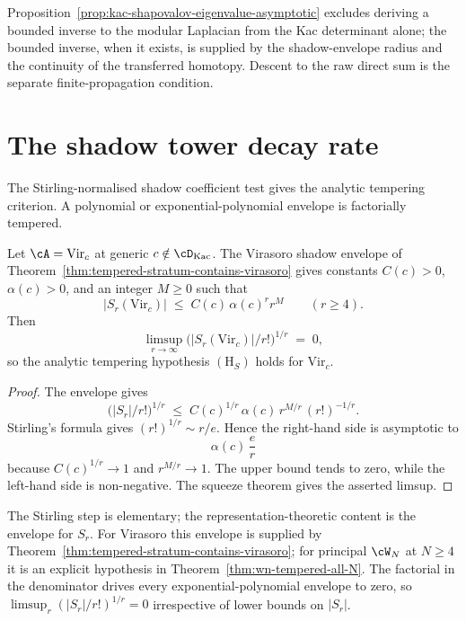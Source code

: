 \begin{remark}
\label{rem:why-no-naive-geometric-series}
Proposition~\ref{prop:kac-shapovalov-eigenvalue-asymptotic} excludes
deriving a bounded inverse to the modular Laplacian from the Kac
determinant alone; the bounded inverse, when it exists, is supplied by
the shadow-envelope radius and the continuity of the transferred
homotopy. Descent to the raw direct sum is the separate
finite-propagation condition.
\end{remark}

\section{The shadow tower decay rate}
\label{sec:shadow-tower-decay}

The Stirling-normalised shadow coefficient test gives the analytic
tempering criterion. A polynomial or exponential-polynomial envelope
is factorially tempered.

\begin{proposition}
\label{prop:shadow-decay-class-m}
Let $\cA = \mathrm{Vir}_c$ at generic $c \notin \cD_{\mathrm{Kac}}$.
The Virasoro shadow envelope of
Theorem~\ref{thm:tempered-stratum-contains-virasoro} gives constants
$C(c)>0$, $\alpha(c)>0$, and an integer $M\ge 0$ such that
\[
 \bigl\lvert S_r(\mathrm{Vir}_c) \bigr\rvert
 \;\le\;
 C(c)\,\alpha(c)^r r^M
 \qquad (r \ge 4).
\]
Then
\[
 \limsup_{r \to \infty}
 \bigl(\lvert S_r(\mathrm{Vir}_c) \rvert / r!\bigr)^{1/r}
 \;=\;
 0,
\]
so the analytic tempering hypothesis $(\mathrm{H}_S)$ holds for
$\mathrm{Vir}_c$.
\end{proposition}

\begin{proof}
The envelope gives
\[
 \bigl(\lvert S_r\rvert/r!\bigr)^{1/r}
 \;\le\;
 C(c)^{1/r}\,\alpha(c)\,r^{M/r}\,(r!)^{-1/r}.
\]
Stirling's formula gives $(r!)^{1/r}\sim r/e$. Hence the right-hand
side is asymptotic to
\[
 \alpha(c)\,\frac{e}{r}
\]
because $C(c)^{1/r}\to 1$ and $r^{M/r}\to 1$. The upper bound tends
to zero, while the left-hand side is non-negative. The squeeze theorem
gives the asserted limsup.
\end{proof}

\begin{remark}
\label{rem:comparison-classical-va-asymptotics}
The Stirling step is elementary; the representation-theoretic content
is the envelope for $S_r$. For Virasoro this envelope is supplied by
Theorem~\ref{thm:tempered-stratum-contains-virasoro}; for principal
$\cW_N$ at $N\ge 4$ it is an explicit hypothesis in
Theorem~\ref{thm:wn-tempered-all-N}. The factorial in the denominator
drives every exponential-polynomial envelope to zero, so
$\limsup_r(\lvert S_r\rvert/r!)^{1/r}=0$ irrespective of lower bounds
on $\lvert S_r\rvert$.
\end{remark}

